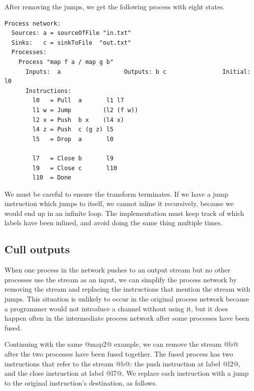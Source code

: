 After removing the jumps, we get the following process with eight states.

\begin{lstlisting}[linebackgroundcolor={
  \hilineFst{8}
  \hilineCom{9}
  \hilineFst{10}
  \hilineSnd{11}
  \hilineFst{12}
  \hilineFst{14}
  \hilineSnd{15}
  \hilineCom{16}
}]
Process network:
  Sources: a = sourceOfFile "in.txt"
  Sinks:   c = sinkToFile  "out.txt"
  Processes:
    Process "map f a / map g b"
      Inputs:  a                  Outputs: b c                Initial: l0
      Instructions:
        l0   = Pull  a       l1 l7
        l1 w = Jump         (l2 (f w))
        l2 x = Push  b x    (l4 x)
        l4 z = Push  c (g z) l5
        l5   = Drop  a       l0

        l7   = Close b       l9
        l9   = Close c       l10
        l10  = Done
\end{lstlisting}

We must be careful to ensure the transform terminates.
If we have a jump instruction which jumps to itself, we cannot inline it recursively, because we would end up in an infinite loop.
The implementation must keep track of which labels have been inlined, and avoid doing the same thing multiple times.


\subsection{Cull outputs}
\label{section:implementation:cull-outputs}

When one process in the network pushes to an output stream but no other processes use the stream as an input, we can simplify the process network by removing the stream and replacing the instructions that mention the stream with jumps.
This situation is unlikely to occur in the original process network because a programmer would not introduce a channel without using it, but it does happen often in the intermediate process network after some processes have been fused.

Continuing with the same @map2@ example, we can remove the stream @b@ after the two processes have been fused together.
The fused process has two instructions that refer to the stream @b@: the push instruction at label @l2@, and the close instruction at label @l7@.
We replace each instruction with a jump to the original instruction's destination, as follows.

